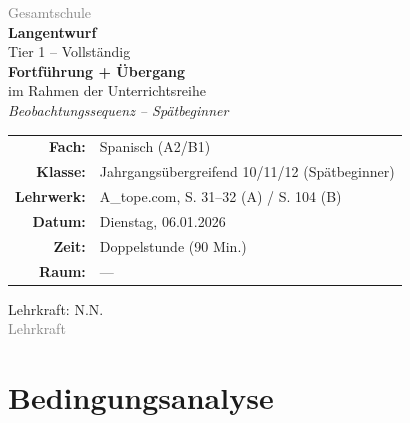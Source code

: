 \documentclass[11pt,a4paper]{article}
\newcommand{\fach}{Spanisch}
\newcommand{\jahrgangsstufe}{10/11/12}
\newcommand{\schulart}{Gesamtschule}
\newcommand{\stundenthema}{Fortführung + Übergang}
\newcommand{\reihenthema}{Beobachtungssequenz -- Spätbeginner}
\newcommand{\unterrichtsdatum}{06.01.2026}
\newcommand{\lehrkraft}{N.N.}
\newcommand{\ausbildungsstand}{Lehrkraft}
\newcommand{\gerniveau}{A2/B1}
\newcommand{\lehrwerk}{A\_tope.com}
\newcommand{\lehrwerkseite}{S. 31--32 (A) / S. 104 (B)}
\begin{document}
\begin{titlepage}
    \centering
    \vspace*{2cm}

    {\large\textcolor{gray}{\schulart}}\\[2cm]

    {\Huge\textcolor{fach}{\textbf{Langentwurf}}}\\[0.5cm]
    {\large Tier 1 -- Vollständig}\\[2cm]

    {\LARGE\textbf{\stundenthema}}\\[0.5cm]
    {\large im Rahmen der Unterrichtsreihe}\\[0.3cm]
    {\Large\textit{\reihenthema}}\\[2cm]

    \begin{tabular}{rl}
        \textbf{Fach:} & \fach{} (\gerniveau) \\[0.3cm]
        \textbf{Klasse:} & Jahrgangsübergreifend \jahrgangsstufe{} (Spätbeginner) \\[0.3cm]
        \textbf{Lehrwerk:} & \lehrwerk, \lehrwerkseite \\[0.3cm]
        \textbf{Datum:} & Dienstag, \unterrichtsdatum \\[0.3cm]
        \textbf{Zeit:} & Doppelstunde (90 Min.) \\[0.3cm]
        \textbf{Raum:} & --- \\[0.3cm]
    \end{tabular}

    \vfill

    {\large Lehrkraft: \lehrkraft}\\[0.3cm]
    {\normalsize\textcolor{gray}{\ausbildungsstand}}\\[1cm]

\end{titlepage}

\tableofcontents
\newpage

\section{Bedingungsanalyse}
\end{document}
